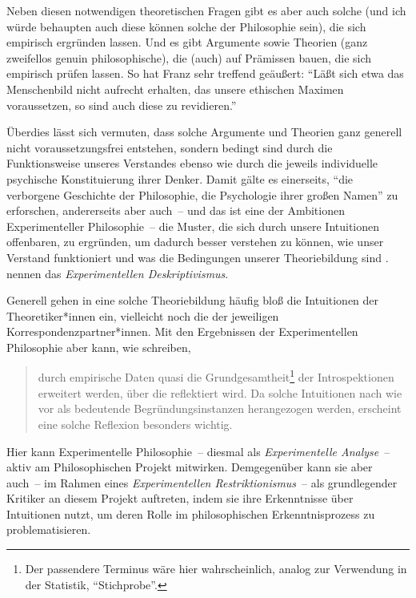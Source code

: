 \documentclass[justified,nobib,nohyper,symmetric,twoside]{tufte-book}
\begin{document}
Neben diesen notwendigen theoretischen Fragen gibt es aber auch solche (und ich würde behaupten auch diese können solche der Philosophie sein), die sich empirisch ergründen lassen.
Und es gibt Argumente sowie Theorien (ganz zweifellos genuin philosophische), die (auch) auf Prämissen bauen, die sich empirisch prüfen lassen.
So hat Franz \citet[S.~670]{kutschera_empirische_1988} sehr treffend geäußert: \enquote{Läßt sich etwa das Menschenbild nicht aufrecht erhalten, das unsere ethischen Maximen voraussetzen, so sind auch diese zu revidieren.}

Überdies lässt sich vermuten, dass solche Argumente und Theorien ganz generell nicht voraussetzungsfrei entstehen, sondern bedingt sind durch die Funktionsweise unseres Verstandes ebenso wie durch die jeweils individuelle psychische Konstituierung ihrer Denker.
Damit gälte es einerseits, \enquote{die verborgene Geschichte der Philosophie, die Psychologie ihrer großen Namen} \citep[S.~259]{nietzsche_ecce_2017} zu erforschen, andererseits aber auch~-- und das ist eine der Ambitionen Experimenteller Philosophie~-- die Muster, die sich durch unsere Intuitionen offenbaren, zu ergründen, um dadurch besser verstehen zu können, wie unser Verstand funktioniert und was die Bedingungen unserer Theoriebildung sind \citep[S.~12]{knobe_experimental_2008}. \citet{nadelhoffer_past_2007} nennen das \textit{Experimentellen Deskriptivismus}.

Generell gehen in eine solche Theoriebildung häufig bloß die Intuitionen der Theoretiker*innen ein, vielleicht noch die der jeweiligen Korrespondenzpartner*innen.
Mit den Ergebnissen der Experimentellen Philosophie aber kann, wie \citet[S.~21]{bauer_zwei_2019} schreiben,

\begin{quote}
   durch empirische Daten quasi die Grundgesamtheit\footnote{Der passendere Terminus wäre hier wahrscheinlich, analog zur Verwendung in der Statistik, \enquote{Stichprobe}.} der Introspektionen erweitert werden, über die reflektiert wird. Da solche Intuitionen nach wie vor als bedeutende Begründungsinstanzen herangezogen werden, erscheint eine solche Reflexion besonders wichtig.
\end{quote}

\noindent Hier kann Experimentelle Philosophie~-- diesmal als \textit{Experimentelle Analyse}~-- aktiv am Philosophischen Projekt mitwirken. Demgegenüber kann sie aber auch~-- im Rahmen eines \textit{Experimentellen Restriktionismus}~-- als grundlegender Kritiker an diesem Projekt auftreten, indem sie ihre Erkenntnisse über Intuitionen nutzt, um deren Rolle im philosophischen Erkenntnisprozess zu problematisieren.
\end{document}
